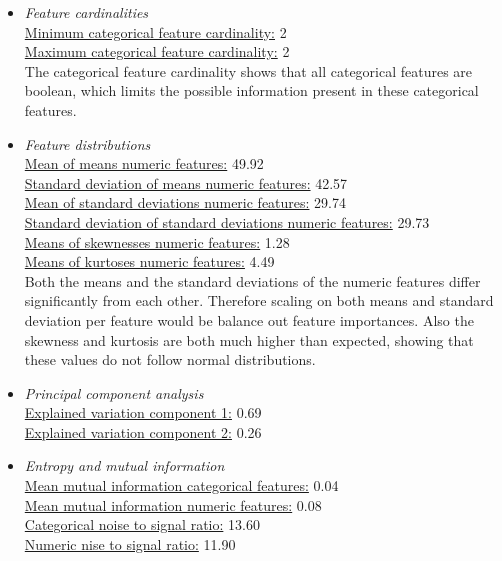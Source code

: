 \documentclass[10pt,a4paper]{report}
\begin{document}
\begin{itemize}
		\item \textit{Feature cardinalities} \\
		\underline{Minimum categorical feature cardinality:} 2 \\
		\underline{Maximum categorical feature cardinality:} 2 \\
		
		The categorical feature cardinality shows that all categorical features are boolean, which limits the possible information present in these categorical features.
		
		\item \textit{Feature distributions} \\
		\underline{Mean of means numeric features:} 49.92 \\
		\underline{Standard deviation of means numeric features:} 42.57 \\
		\underline{Mean of standard deviations numeric features:} 29.74 \\
		\underline{Standard deviation of standard deviations numeric features:} 29.73 \\
		\underline{Means of skewnesses numeric features:} 1.28 \\
		\underline{Means of kurtoses numeric features:} 4.49 \\
		
		Both the means and the standard deviations of the numeric features differ significantly from each other. Therefore scaling on both means and standard deviation per feature would be balance out feature importances. Also the skewness and kurtosis are both much higher than expected, showing that these values do not follow normal distributions.
		
		\item \textit{Principal component analysis} \\
		\underline{Explained variation component 1:} 0.69 \\
		\underline{Explained variation component 2:} 0.26 \\
		\item \textit{Entropy and mutual information} \\
		\underline{Mean mutual information categorical features:} 0.04 \\
		\underline{Mean mutual information numeric features:} 0.08 \\
		\underline{Categorical noise to signal ratio:} 13.60 \\
		\underline{Numeric nise to signal ratio:} 11.90 \\
		

\end{itemize}
\end{document}
